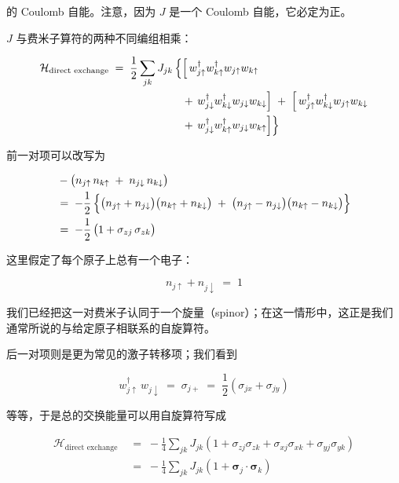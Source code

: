的 Coulomb 自能。注意，因为 $J$ 是一个 Coulomb 自能，它必定为正。

$J$ 与费米子算符的两种不同编组相乘：

\begin{align*}
\mathcal{H}_{\text{direct exchange}} \;=\; \frac{1}{2} \sum_{jk} J_{jk}\, \Bigl\{ &\Bigl[\, w^{\dagger}_{j\uparrow} w^{\dagger}_{k\uparrow} w_{j\uparrow} w_{k\uparrow} \\
&+\, w^{\dagger}_{j\downarrow} w^{\dagger}_{k\downarrow} w_{j\downarrow} w_{k\downarrow} \Bigr] \;+\; \Bigl[\, w^{\dagger}_{j\uparrow} w^{\dagger}_{k\downarrow} w_{j\uparrow} w_{k\downarrow} \\
&+\, w^{\dagger}_{j\downarrow} w^{\dagger}_{k\uparrow} w_{j\downarrow} w_{k\uparrow} \Bigr] \Bigr\}
\end{align*}

前一对项可以改写为

\begin{align*}
&-\bigl(n_{j\uparrow}\, n_{k\uparrow} \;+\; n_{j\downarrow}\, n_{k\downarrow}\bigr) \\
&=\; -\frac{1}{2}\,\Bigl\{ \bigl(n_{j\uparrow} + n_{j\downarrow}\bigr)\bigl(n_{k\uparrow} + n_{k\downarrow}\bigr) \;+\; \bigl(n_{j\uparrow} - n_{j\downarrow}\bigr)\bigl(n_{k\uparrow} - n_{k\downarrow}\bigr) \Bigr\} \\
&=\; -\frac{1}{2}\,\bigl(1 + \sigma_{zj}\, \sigma_{zk}\bigr)
\end{align*}

这里假定了每个原子上总有一个电子：

\begin{equation*}
n_{j\uparrow} + n_{j\downarrow} \;=\; 1
\end{equation*}

我们已经把这一对费米子认同于一个旋量（spinor）；在这一情形中，这正是我们通常所说的与给定原子相联系的自旋算符。

后一对项则是更为常见的激子转移项；我们看到

\begin{equation*}
w^{\dagger}_{j\uparrow}\, w_{j\downarrow} \;=\; \sigma_{j+} \;=\; \frac{1}{2}\left(\sigma_{jx} + \sigma_{jy}\right)
\end{equation*}

等等，于是总的交换能量可以用自旋算符写成

\begin{align*}
\mathcal{H}_{\text{direct exchange}} \;&=\; -\frac{1}{4} \sum_{jk} J_{jk}\left(1 + \sigma_{zj}\sigma_{zk} + \sigma_{xj}\sigma_{xk} + \sigma_{yj}\sigma_{yk}\right) \\
&=\; -\frac{1}{4} \sum_{jk} J_{jk}\left(1 + \boldsymbol{\sigma}_{j}\cdot\boldsymbol{\sigma}_{k}\right) \tag{23}
\end{align*}

